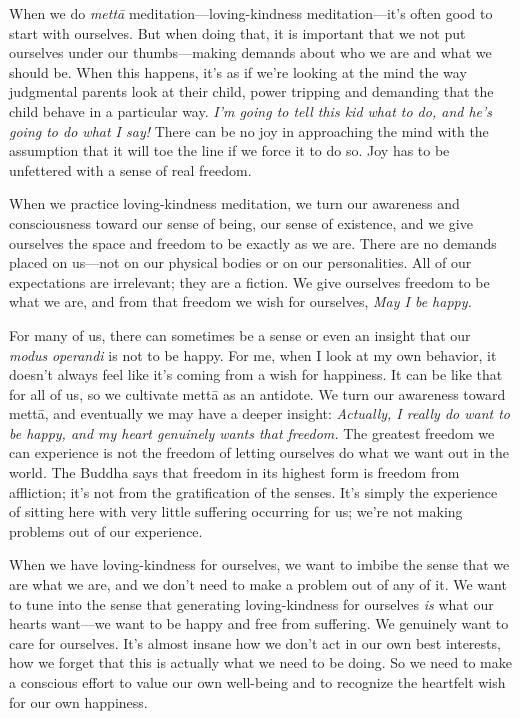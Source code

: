 
When we do \emph{mettā} meditation---loving-kindness meditation---it's 
often good to start with ourselves. But when doing that, it is 
important that we not put ourselves under our thumbs---making demands 
about who we are and what we should be. When this happens, it's as if 
we're looking at the mind the way judgmental parents look at their 
child, power tripping and demanding that the child behave in a 
particular way. \emph{I'm going to tell this kid what to do, and he's 
going to do what I say!} There can be no joy in approaching the mind 
with the assumption that it will toe the line if we force it to do so. 
Joy has to be unfettered with a sense of real freedom.

When we practice loving-kindness meditation, we turn our awareness and 
consciousness toward our sense of being, our sense of existence, and we 
give ourselves the space and freedom to be exactly as we are. There are 
no demands placed on us---not on our physical bodies or on our 
personalities. All of our expectations are irrelevant; they are a 
fiction. We give ourselves freedom to be what we are, and from that 
freedom we wish for ourselves, \emph{May I be happy.}

For many of us, there can sometimes be a sense or even an insight that 
our \emph{modus} \emph{operandi} is not to be happy. For me, when I 
look at my own behavior, it doesn't always feel like it's coming from a 
wish for happiness. It can be like that for all of us, so we cultivate 
mettā as an antidote. We turn our awareness toward mettā, and 
eventually we may have a deeper insight: \emph{Actually, I really do 
want to be happy, and my heart genuinely wants that freedom.} The 
greatest freedom we can experience is not the freedom of letting 
ourselves do what we want out in the world. The Buddha says that 
freedom in its highest form is freedom from affliction; it's not from 
the gratification of the senses. It's simply the experience of sitting 
here with very little suffering occurring for us; we're not making 
problems out of our experience.

When we have loving-kindness for ourselves, we want to imbibe the sense 
that we are what we are, and we don't need to make a problem out of any 
of it. We want to tune into the sense that generating loving-kindness 
for ourselves \emph{is} what our hearts want---we want to be happy and 
free from suffering. We genuinely want to care for ourselves. It's 
almost insane how we don't act in our own best interests, how we forget 
that this is actually what we need to be doing. So we need to make a 
conscious effort to value our own well-being and to recognize the 
heartfelt wish for our own happiness.

